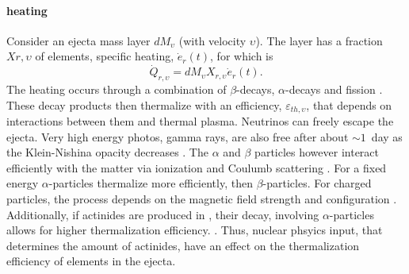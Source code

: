 \paragraph{\rproc{} heating}
%
Consider an ejecta mass layer $dM_{\upsilon}$ (with velocity $\upsilon$).
The layer has a fraction $X{r,\upsilon}$ of \rproc{} elements, specific heating, $\dot{e}_r(t)$,  
for which is 
%
\begin{equation}
\dot{Q}_{r,\upsilon} = dM_{\upsilon}X_{r,\upsilon}\dot{e}_{r}(t).
\end{equation}
%
The heating occurs through a combination of $\beta$-decays, $\alpha$-decays and fission 
\citep{Metzger:2010,Barnes:2016umi,Hotokezaka:2017dbk}. These decay products then thermalize 
with an efficiency, $\varepsilon_{th,\upsilon}$, that depends on interactions between them and 
thermal plasma. Neutrinos can freely escape the ejecta. Very high energy photos, gamma rays, 
are also free after about $\sim 1$~day as the Klein-Nishina opacity decreases 
\citep{Hotokezaka:2017dbk,Barnes:2016umi}.
%
The $\alpha$ and $\beta$ particles however interact efficiently with the matter via 
ionization \citep{Barnes:2016umi} and Coulumb scattering \citep{Metzger:2010}.
For a fixed energy $\alpha$-particles thermalize more efficiently, then $\beta$-particles.
For charged particles, the process depends on the magnetic field strength and configuration 
\citep{Barnes:2016umi}. Additionally, if actinides are produced in \rproc{}, their decay, 
involving $\alpha$-particles allows for higher thermalization efficiency. 
. 
Thus, nuclear phsyics input, that determines the amount of actinides, have an effect on the 
thermalization efficiency of \rproc{} elements in the ejecta.
%
